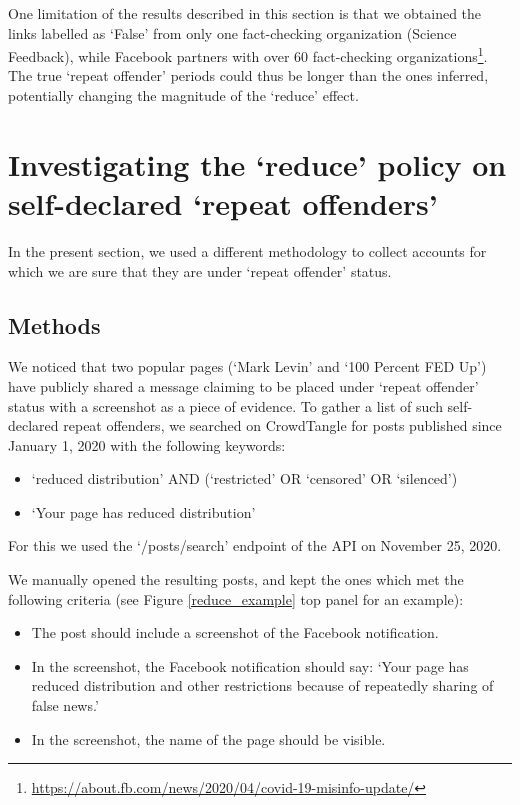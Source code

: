 \documentclass[11pt,a4paper]{article}
\begin{document}
One limitation of the results described in this section is that we obtained the links labelled as `False' from only one fact-checking organization (Science Feedback), while Facebook partners with over 60 fact-checking organizations\footnote{\href{https://about.fb.com/news/2020/04/covid-19-misinfo-update/}{https://about.fb.com/news/2020/04/covid-19-misinfo-update/}}.
The true `repeat offender' periods could thus be longer than the ones inferred, potentially changing the magnitude of the ‘reduce’ effect.

\section{Investigating the `reduce' policy on self-declared `repeat offenders'}

In the present section, we used a different methodology to collect accounts for which we are sure that they are under `repeat offender' status. 

\subsection{Methods}

We noticed that two popular pages (`Mark Levin' and `100 Percent FED Up') have publicly shared a message claiming to be placed under `repeat offender' status with a screenshot as a piece of evidence.
To gather a list of such self-declared repeat offenders, we searched on CrowdTangle for posts published since January 1, 2020 with the following keywords:
\begin{itemize}
\item `reduced distribution' AND (`restricted' OR `censored' OR `silenced')
\item `Your page has reduced distribution'
\end{itemize}
For this we used the `/posts/search' endpoint of the API on November 25, 2020. 

We manually opened the resulting posts, and kept the ones which met the following criteria (see Figure \ref{reduce_example} top panel for an example):
\begin{itemize}
\item The post should include a screenshot of the Facebook notification.
\item In the screenshot, the Facebook notification should say: `Your page has reduced distribution and other restrictions because of repeatedly sharing of false news.'
\item In the screenshot, the name of the page should be visible.
\end{itemize}
\end{document}
